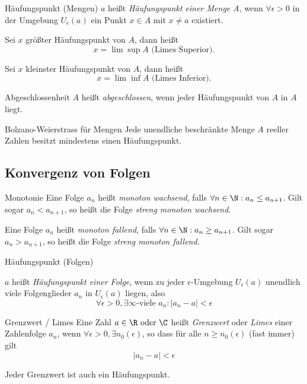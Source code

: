 \documentclass[german]{../spicker}
\renewcommand{\abs}[1]{\left| #1 \right|}
\begin{document}
\begin{defi}{Häufungspunkt (Mengen)}
    $a$ heißt \emph{Häufungspunkt einer Menge A}, wenn $\forall \epsilon > 0$ in der Umgebung $U_\epsilon (a)$ ein Punkt $x \in A$ mit $x \neq a$ existiert.

    Sei $x$ größter Häufungspunkt von $A$, dann heißt
    $$
        x = \lim\sup A \text{ (Limes Superior).}
    $$

    Sei $x$ kleinster Häufungspunkt von $A$, dann heißt
    $$
        x = \lim\inf A \text{ (Limes Inferior).}
    $$
\end{defi}

\begin{defi}{Abgeschlossenheit}
    $A$ heißt \emph{abgeschlossen}, wenn jeder Häufungspunkt von $A$ in $A$ liegt.
\end{defi}

\begin{defi}{Bolzano-Weierstrass für Mengen}
    Jede unendliche beschränkte Menge $A$ reeller Zahlen besitzt mindestens einen Häufungspunkt.
\end{defi}

\subsection{Konvergenz von Folgen}

\begin{defi}{Monotonie}
    Eine Folge $a_n$ heißt \emph{monoton wachsend}, falls $\forall n \in \N : a_n \leq a_{n+1}$.
    Gilt sogar $a_n < a_{n+1}$, so heißt die Folge \emph{streng monoton wachsend}.

    Eine Folge $a_n$ heißt \emph{monoton fallend}, falls $\forall n \in \N : a_n \geq a_{n+1}$.
    Gilt sogar $a_n > a_{n+1}$, so heißt die Folge \emph{streng monoton fallend}.
\end{defi}

\begin{defi}{Häufungspunkt (Folgen)}

    $a$ heißt \emph{Häufungspunkt einer Folge}, wenn zu jeder $\epsilon$-Umgebung $U_\epsilon (a)$ unendlich viele Folgenglieder $a_n$ in $U_\epsilon (a)$ liegen, also
    $$
        \forall \epsilon > 0 , \exists \infty\text{-viele } a_n : \abs{a_n - a} < \epsilon
    $$
\end{defi}

\begin{defi}{Grenzwert / Limes}
    Eine Zahl $a\in \R \text{ oder } \C$ heißt \emph{Grenzwert} oder \emph{Limes} einer Zahlenfolge $a_n$, wenn $\forall \epsilon >0, \exists n_0 (\epsilon)$, so dass für alle $n \geq n_0 (\epsilon)$ (fast immer) gilt
    $$
        \abs{a_n - a} < \epsilon
    $$

    Jeder Grenzwert ist auch ein Häufungspunkt.
\end{defi}
\end{document}
